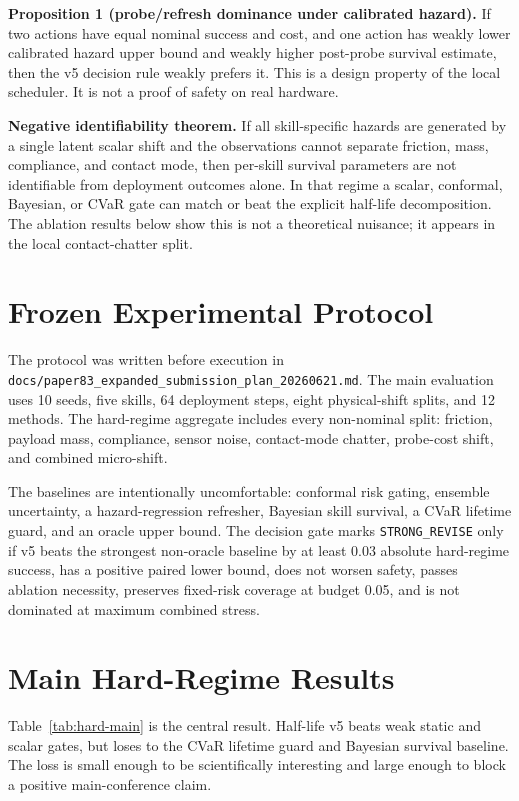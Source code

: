 \documentclass{article}
\begin{document}
\textbf{Proposition 1 (probe/refresh dominance under calibrated hazard).} If two actions have equal nominal success and cost, and one action has weakly lower calibrated hazard upper bound and weakly higher post-probe survival estimate, then the v5 decision rule weakly prefers it. This is a design property of the local scheduler. It is not a proof of safety on real hardware.

\textbf{Negative identifiability theorem.} If all skill-specific hazards are generated by a single latent scalar shift and the observations cannot separate friction, mass, compliance, and contact mode, then per-skill survival parameters are not identifiable from deployment outcomes alone. In that regime a scalar, conformal, Bayesian, or CVaR gate can match or beat the explicit half-life decomposition. The ablation results below show this is not a theoretical nuisance; it appears in the local contact-chatter split.

\section{Frozen Experimental Protocol}

The protocol was written before execution in \texttt{docs/paper83\_expanded\_submission\_plan\_20260621.md}. The main evaluation uses 10 seeds, five skills, 64 deployment steps, eight physical-shift splits, and 12 methods. The hard-regime aggregate includes every non-nominal split: friction, payload mass, compliance, sensor noise, contact-mode chatter, probe-cost shift, and combined micro-shift.

The baselines are intentionally uncomfortable: conformal risk gating, ensemble uncertainty, a hazard-regression refresher, Bayesian skill survival, a CVaR lifetime guard, and an oracle upper bound. The decision gate marks \texttt{STRONG\_REVISE} only if v5 beats the strongest non-oracle baseline by at least 0.03 absolute hard-regime success, has a positive paired lower bound, does not worsen safety, passes ablation necessity, preserves fixed-risk coverage at budget 0.05, and is not dominated at maximum combined stress.

\section{Main Hard-Regime Results}

Table~\ref{tab:hard-main} is the central result. Half-life v5 beats weak static and scalar gates, but loses to the CVaR lifetime guard and Bayesian survival baseline. The loss is small enough to be scientifically interesting and large enough to block a positive main-conference claim.
\end{document}
